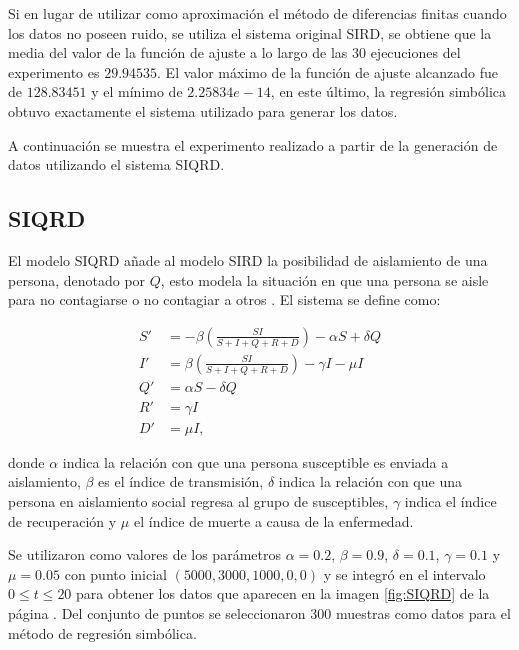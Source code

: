 Si en lugar de utilizar como aproximación el método de diferencias finitas cuando los datos no poseen ruido, se utiliza el sistema original SIRD, se obtiene que la media del valor de la función de ajuste a lo largo de las 30 ejecuciones del experimento es $29.94535$. El valor máximo de la función de ajuste alcanzado fue de $128.83451$ y el mínimo de $2.25834e-14$, en este último, la regresión simbólica obtuvo exactamente el sistema utilizado para generar los datos.

A continuación se muestra el experimento realizado a partir de la generación de datos utilizando el sistema SIQRD.

\subsection{SIQRD}

El modelo SIQRD añade al modelo SIRD la posibilidad de aislamiento de una persona, denotado por $Q$, esto modela la situación en que una persona se aisle para no contagiarse o no contagiar a otros \cite{molter2021mathematical}. El sistema se define como:

\begin{align*}
    S' & = -\beta (\frac{S I}{S + I + Q + R + D}) - \alpha S + \delta Q \\
    I' & = \beta (\frac{S I}{S + I + Q + R + D}) - \gamma I - \mu I     \\
    Q' & = \alpha S - \delta Q                                          \\
    R' & = \gamma I                                                     \\
    D' & = \mu I,
\end{align*}

donde $\alpha$ indica la relación con que una persona susceptible es enviada a aislamiento, $\beta$ es el índice de transmisión, $\delta$ indica la relación con que una persona en aislamiento social regresa al grupo de susceptibles, $\gamma$ indica el índice de recuperación y $\mu$ el índice de muerte a causa de la enfermedad.

Se utilizaron como valores de los parámetros $\alpha = 0.2$, $\beta = 0.9$, $\delta = 0.1$, $\gamma = 0.1$ y $\mu = 0.05$ con punto inicial $(5000, 3000, 1000, 0, 0)$ y se integró en el intervalo $0 \leq t \leq 20$ para obtener los datos que aparecen en la imagen \ref{fig:SIQRD} de la página \pageref{fig:SIQRD}. Del conjunto de puntos se seleccionaron 300 muestras como datos para el método de regresión simbólica.

